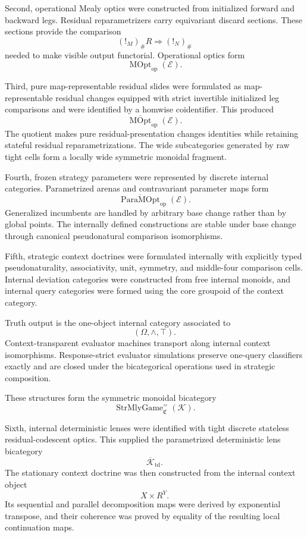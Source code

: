 Second, operational Mealy optics were constructed from initialized forward and backward legs.
Residual reparametrizers carry equivariant discard sections. These sections provide the comparison
\[
  (!_M)_\#R
  \Longrightarrow
  (!_N)_\#
\]
needed to make visible output functorial. Operational optics form
\[
  \operatorname{MOpt}_{\mathrm{op}}(\mathcal E).
\]

Third, pure map-representable residual slides were formulated as map-representable residual changes
equipped with strict invertible initialized leg comparisons and were identified by a homwise
coidentifier. This produced
\[
  \overline{\operatorname{MOpt}}_{\mathrm{op}}(\mathcal E).
\]
The quotient makes pure residual-presentation changes identities while retaining stateful residual
reparametrizations. The wide subcategories generated by raw tight cells form a locally wide
symmetric monoidal fragment.

Fourth, frozen strategy parameters were represented by discrete internal categories. Parametrized
arenas and contravariant parameter maps form
\[
  \overline{\operatorname{ParaMOpt}}_{\mathrm{op}}(\mathcal E).
\]
Generalized incumbents are handled by arbitrary base change rather than by global points. The
internally defined constructions are stable under base change through canonical pseudonatural
comparison isomorphisms.

Fifth, strategic context doctrines were formulated internally with explicitly typed
pseudonaturality, associativity, unit, symmetry, and middle-four comparison cells. Internal deviation
categories were constructed from free internal monoids, and internal query categories were formed
using the core groupoid of the context category.

Truth output is the one-object internal category associated to
\[
  (\Omega,\wedge,\top).
\]
Context-transparent evaluator machines transport along internal context isomorphisms. Response-strict
evaluator simulations preserve one-query classifiers exactly and are closed under the bicategorical
operations used in strategic composition.

These structures form the symmetric monoidal bicategory
\[
  \operatorname{StrMlyGame}^{=}_{\mathfrak C}(\mathcal K).
\]

Sixth, internal deterministic lenses were identified with tight discrete stateless
residual-codescent optics. This supplied the parametrized deterministic lens bicategory
\[
  \overline{\mathcal K}_{\mathrm{td}}.
\]
The stationary context doctrine was then constructed from the internal context object
\[
  X\times R^Y.
\]
Its sequential and parallel decomposition maps were derived by exponential transpose, and their
coherence was proved by equality of the resulting local continuation maps.

